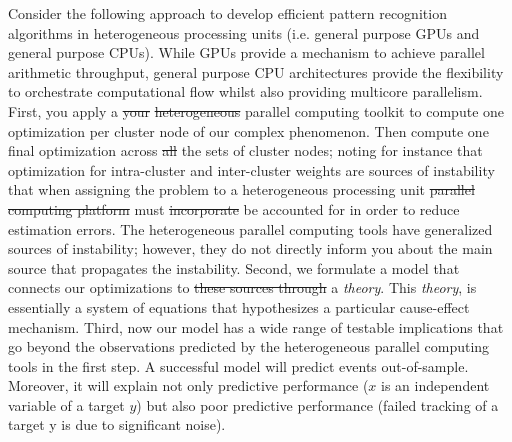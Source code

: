 \documentclass[10pt]{article}[draft]
\begin{document}
Consider the following approach to develop efficient pattern recognition algorithms in heterogeneous processing units (i.e. general purpose GPUs and general purpose CPUs). While GPUs provide a mechanism to achieve parallel arithmetic throughput, general purpose CPU architectures provide the flexibility to orchestrate computational flow whilst also providing multicore parallelism. First, you apply a \st{your} \st{heterogeneous} parallel computing toolkit to compute one optimization per cluster node of our complex phenomenon. Then compute one final optimization across \st{all} the sets of cluster nodes; noting for instance that optimization for intra-cluster and inter-cluster weights are sources of instability that when assigning the problem to a heterogeneous processing unit \st{parallel computing platform} must \st{incorporate} be accounted for in order to reduce estimation errors. The heterogeneous parallel computing tools have generalized  sources of instability; however, they do not directly inform you about the main source that propagates the instability. Second, we formulate a model that connects our optimizations to  \st{these sources through} a \emph{theory}. This \emph{theory}, is essentially a system of equations that hypothesizes a particular cause-effect mechanism. Third, now our model has a wide range of testable implications that go beyond the observations predicted by the heterogeneous parallel computing tools in the first step. A successful model will predict events out-of-sample. Moreover, it will explain not only predictive performance ($x$ is an independent variable of a target $y$) but also poor predictive performance (failed tracking of a target y is due to significant noise). 
	
\end{document}

